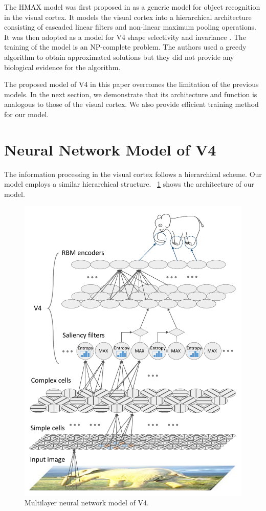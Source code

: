 \documentclass[conference]{IEEEtran}
\begin{document}
The HMAX model was first proposed in \cite{riesenhuber1999}
as a generic model for object recognition in the visual cortex.
It models the visual cortex into a hierarchical architecture 
consisting of cascaded linear filters and non-linear maximum pooling operations.
It was then adopted as a model for V4 shape selectivity and invariance \cite{cadieu2007}.
The training of the model is an NP-complete problem. 
The authors used a greedy algorithm to obtain approximated solutions
but they did not provide any biological evidence for the algorithm. 

The proposed model of V4 in this paper overcomes the limitation of the previous models.
In the next section, we demonstrate that its architecture and function is analogous 
to those of the visual cortex.
We also provide efficient training method for our model.


\section{Neural Network Model of V4}
\label{sec:3}

The information processing in the visual cortex follows a hierarchical scheme.
Our model employs a similar hierarchical structure.
\figurename~\ref{fig:3} shows the architecture of our model.

\begin{figure}[htp]
\centerline{\includegraphics[width=0.95\linewidth]{images/fig3.pdf}} 
\caption{Multilayer neural network model of V4.}
\label{fig:3}
\end{figure}
\end{document}
